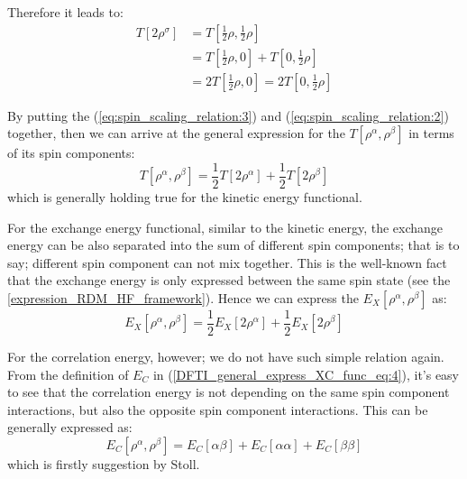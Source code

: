 Therefore it leads to:
\begin{equation}
\label{eq:spin_scaling_relation:3}
\begin{split}
  T[2\rho^{\sigma}] &= T[\frac{1}{2}\rho, \frac{1}{2}\rho] \\
    &= T[\frac{1}{2}\rho, 0]  +
       T[0, \frac{1}{2}\rho] \\
    &= 2T[\frac{1}{2}\rho, 0] = 2T[0, \frac{1}{2}\rho]
\end{split}
\end{equation}

By putting the (\ref{eq:spin_scaling_relation:3}) and
(\ref{eq:spin_scaling_relation:2}) 
together, then we can arrive at the general expression for the
$T[\rho^{\alpha}, \rho^{\beta}]$ in terms of its spin components:
\begin{equation}
\label{eq:spin_scaling_relation:4}
T[\rho^{\alpha}, \rho^{\beta}] = \frac{1}{2}T[2\rho^{\alpha}] +
\frac{1}{2}T[2\rho^{\beta}]
\end{equation}
which is generally holding true for the kinetic energy functional.

For the exchange energy functional, similar to the kinetic energy, the
exchange energy can be also separated into the sum of different spin
components; that is to say; different spin component can not mix
together. This is the well-known fact that the exchange energy is only
expressed between the same spin state (see the
\ref{expression_RDM_HF_framework}). Hence we can express the
$E_{X}[\rho^{\alpha}, \rho^{\beta}]$ as:
\begin{equation}
\label{eq:spin_scaling_relation:5} 
E_{X}[\rho^{\alpha},
\rho^{\beta}] = \frac{1}{2}E_{X}[2\rho^{\alpha}] +
\frac{1}{2}E_{X}[2\rho^{\beta}]
\end{equation} 

For the correlation energy, however; we do not have such simple
relation again. From the definition of $E_{C}$ in
(\ref{DFTI_general_express_XC_func_eq:4}), it's easy to see that the
correlation energy is not depending on the same spin component interactions,
but also the opposite spin component interactions. This can be generally
expressed as:
\begin{equation}
\label{eq:spin_scaling_relation:6} 
  E_{C}[\rho^{\alpha}, \rho^{\beta}] =
  E_{C}[\alpha\beta] + E_{C}[\alpha\alpha] + E_{C}[\beta\beta]
\end{equation}
which is firstly suggestion by Stoll\cite{Stoll1978}. 




